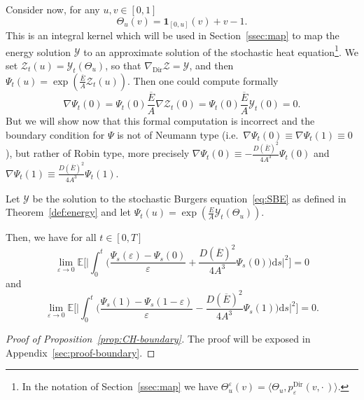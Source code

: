 \documentclass[AHL,Unicode,longabstracts]{cedram}
\DeclareMathOperator{\Dir}{Dir}
\newcommand{\mc}[1]{{\mathcal #1}}
\renewcommand{\mc}[1]{{\mathcal #1}}
\renewcommand{\bar}{\overline}
\newcommand*{\dd}{\mathrm{d}}
\newcommand*{\ds}{\dd s}
\renewcommand{\tfrac}{\frac}
\begin{document}
Consider now, for any $u,v\in[0,1]$
\[
\Theta_u(v) =\mathbf{1}_{[0, u]} (v) + v-1.
\]
This is an integral kernel which will be used in Section~\ref{ssec:map} to map the energy solution $\mc Y$ to an approximate solution of the stochastic heat equation\footnote{In the notation of Section~\ref{ssec:map} we have $\Theta^\varepsilon_u(v) = \langle \Theta_u, p_\varepsilon^{\Dir}(v,\cdot\,)\rangle$.}\!. We set $\mc Z_t(u) = \mc Y_t(\Theta_u)$, so that $\nabla_{\Dir} \mc Z = \mc Y$, and then $\Psi_t(u) = \exp(\tfrac{\bar{E}}{A} \mc Z_t(u))$. Then one could compute formally
\[
\nabla \Psi_t(0) = \Psi_t(0) \tfrac{\bar{E}}{A} \nabla \mc Z_t(0) = \Psi_t(0) \tfrac{\bar{E}}{A} \mc Y_t(0) = 0.
\]
But we will show now that this formal computation is incorrect and the boundary condition for $\Psi$ is not of Neumann type (i.e.~$\nabla \Psi_t(0) \equiv \nabla \Psi_t(1) \equiv 0$), but rather of Robin type, more precisely $\nabla \Psi_t(0) \equiv - \tfrac{D(\bar{E})^2}{4A^3} \Psi_t(0)$ and $\nabla \Psi_t(1) \equiv \tfrac{D(\bar{E})^2}{4A^3} \Psi_t(1)$.

\begin{prop}\label{prop:CH-boundary}
Let $\mc Y$ be the solution to the stochastic Burgers equation~\eqref{eq:SBE} as defined in Theorem~\ref{def:energy} and let $\Psi_t(u)=\exp(\frac E A \mc Y_t(\Theta_u))$.

Then, we have for all $t \in [0,T]$
\[
\lim_{\varepsilon \rightarrow 0} \mathbb{E} \bigg[
\bigg| \int_0^t \bigg(\frac{\Psi_s (\varepsilon) - \Psi_s(0)}{\varepsilon} + \frac{D(\bar{E})^2}{4A^3} \Psi_s(0) \bigg)\ds \bigg|^2 \bigg] = 0
\]
and
\[
\lim_{\varepsilon \rightarrow 0} \mathbb{E} \bigg[
\bigg| \int_0^t \bigg(\frac{\Psi_s (1) - \Psi_s(1-\varepsilon)}{\varepsilon} - \frac{D(\bar{E})^2}{4A^3} \Psi_s(1) \bigg)\ds \bigg|^2 \bigg] = 0.
\]
\end{prop}

\begin{proof}[Proof of Proposition~\ref{prop:CH-boundary}]
The proof will be exposed in Appendix~\ref{sec:proof-boundary}.
\end{proof}
\end{document}
